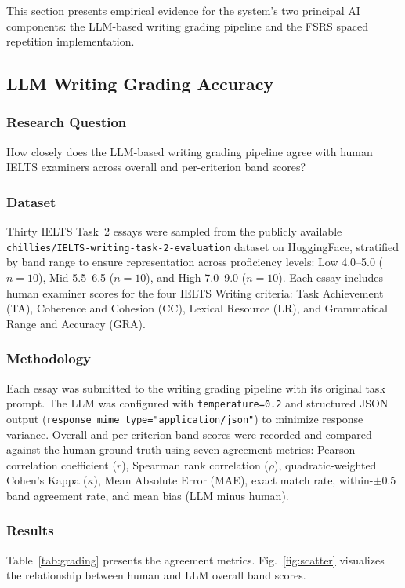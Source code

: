 \documentclass[conference]{IEEEtran}
\begin{document}
This section presents empirical evidence for the system's two principal AI components: the LLM-based writing grading pipeline and the FSRS spaced repetition implementation.

\subsection{LLM Writing Grading Accuracy}

\subsubsection{Research Question}
How closely does the LLM-based writing grading pipeline agree with human IELTS examiners across overall and per-criterion band scores?

\subsubsection{Dataset}
Thirty IELTS Task~2 essays were sampled from the publicly available \texttt{chillies/IELTS-writing-task-2-evaluation} dataset on HuggingFace, stratified by band range to ensure representation across proficiency levels: Low 4.0--5.0 ($n=10$), Mid 5.5--6.5 ($n=10$), and High 7.0--9.0 ($n=10$). Each essay includes human examiner scores for the four IELTS Writing criteria: Task Achievement (TA), Coherence and Cohesion (CC), Lexical Resource (LR), and Grammatical Range and Accuracy (GRA).

\subsubsection{Methodology}
Each essay was submitted to the writing grading pipeline with its original task prompt. The LLM was configured with \texttt{temperature=0.2} and structured JSON output (\texttt{response\_mime\_type="application/json"}) to minimize response variance. Overall and per-criterion band scores were recorded and compared against the human ground truth using seven agreement metrics: Pearson correlation coefficient ($r$), Spearman rank correlation ($\rho$), quadratic-weighted Cohen's Kappa ($\kappa$), Mean Absolute Error (MAE), exact match rate, within-$\pm$0.5 band agreement rate, and mean bias (LLM minus human).

\subsubsection{Results}
Table~\ref{tab:grading} presents the agreement metrics. Fig.~\ref{fig:scatter} visualizes the relationship between human and LLM overall band scores.
\end{document}
